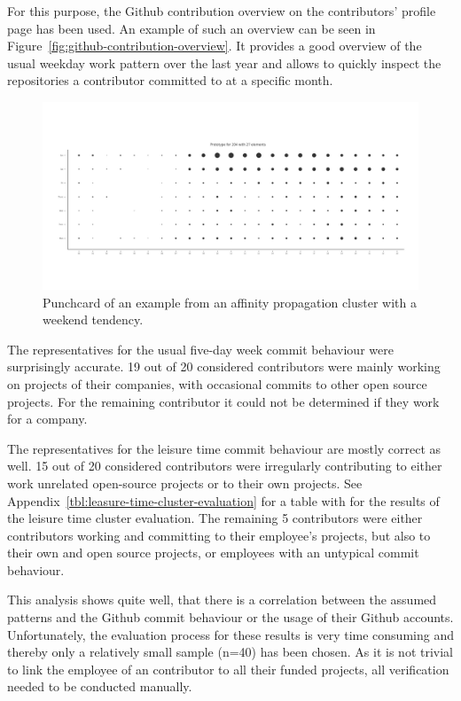 For this purpose, the Github contribution overview on the contributors' profile page has been used.
An example of such an overview can be seen in Figure~\ref{fig:github-contribution-overview}.
It provides a good overview of the usual weekday work pattern over the last year and allows to quickly inspect the repositories a contributor committed to at a specific month.

\begin{figure}[H]
    \includegraphics[scale=0.32]{./graphs/analysis-affinity/204}
    \centering
    \caption{Punchcard of an example from an affinity propagation cluster with a weekend tendency.}\label{fig:leisure-time-hours}
\end{figure}

The representatives for the usual five-day week commit behaviour were surprisingly accurate.
19 out of 20 considered contributors were mainly working on projects of their companies, with occasional commits to other open source projects.
For the remaining contributor it could not be determined if they work for a company.



The representatives for the leisure time commit behaviour are mostly correct as well.
15 out of 20 considered contributors were irregularly contributing to either work unrelated open-source projects or to their own projects.
See Appendix~\ref{tbl:leasure-time-cluster-evaluation} for a table with for the results of the leisure time cluster evaluation.
The remaining 5 contributors were either contributors working and committing to their employee's projects, but also to their own and open source projects, or employees with an untypical commit behaviour.

This analysis shows quite well, that there is a correlation between the assumed patterns and the Github commit behaviour or the usage of their Github accounts.
Unfortunately, the evaluation process for these results is very time consuming and thereby only a relatively small sample (n=40) has been chosen.
As it is not trivial to link the employee of an contributor to all their funded projects, all verification needed to be conducted manually.


